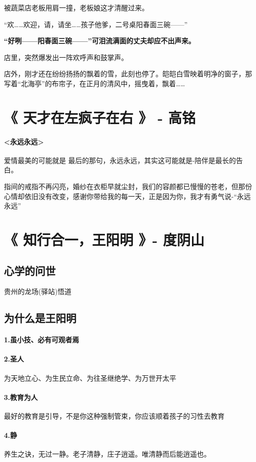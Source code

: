 \documentclass[UTF8,a4paper,8pt]{ctexart}
\begin{document}
 被蔬菜店老板用肩一撞，老板娘这才清醒过来。
 
 “欢……欢迎，请，请坐……孩子他爹，二号桌阳春面三碗——”
 
 \textbf{ “好咧——阳春面三碗——”可泪流满面的丈夫却应不出声来。}
 
 店里，突然爆发出一阵欢呼声和鼓掌声。
 
 店外，刚才还在纷纷扬扬的飘着的雪，此刻也停了。皑皑白雪映着明净的窗子，那写着“北海亭”的布帘子，在正月的清风中，摇曳着，飘着……
 
 \newpage
 \section{《 天才在左疯子在右 》 - 高铭}
 \paragraph{<永远永远>}爱情最美的可能就是 最后的那句，永远永远，其实这可能就是-陪伴是最长的告白。
 
 指间的戒指不再闪亮，婚纱在衣柜早就尘封，我们的容颜都已慢慢的苍老，但那份心情却依旧没有改变，感谢你带给我的每一天，正是因为你，我才有勇气说-“永远永远”
 \newpage
 \section{《 知行合一，王阳明 》- 度阴山}
 \subsection{心学的问世}
 贵州的龙场(驿站)悟道
 
 \subsection{为什么是王阳明}
 \paragraph{1.虽小技、必有可观者焉}
 \paragraph{2.圣人}
 为天地立心、为生民立命、为往圣继绝学、为万世开太平
 \paragraph{3.教育为人}
 最好的教育是引导，不是你这种强制管束，你应该顺着孩子的习性去教育
 \paragraph{4.静}
 养生之诀，无过一静。老子清静，庄子逍遥。唯清静而后能逍遥也。
\end{document}
